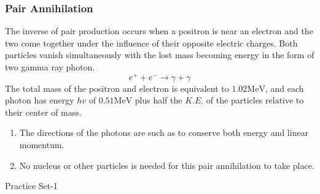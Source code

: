 \subsubsection{Pair Annihilation}
The inverse of pair production occurs when a positron is near an electron and the two come together under the influence of their opposite electric charges. Both particles vanish simultaneously with the lost mass becoming energy in the form of two gamma ray photon.
$$
e^{+}+e^{-} \rightarrow \gamma+\gamma
$$
The total mass of the positron and electron is equivalent to $1.02 \mathrm{MeV}$, and each photon has energy $h v$ of $0.51 \mathrm{MeV}$ plus half the $K . E$. of the particles relative to their center of mass.
\begin{note}
	\begin{enumerate}
		\item The directions of the photons are such as to conserve both energy and linear momentum.
		\item No nucleus or other particles is needed for this pair annihilation to take place.
	\end{enumerate}
\end{note}
\newpage
\begin{abox}
	Practice Set-1
\end{abox}
